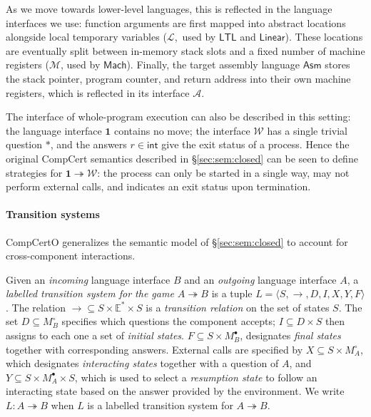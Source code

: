 \documentclass[acmsmall,authordraft]{acmart}
\newcommand{\kw}[1]{\ensuremath{ \mathsf{#1} }}
\newcommand{\que}{\circ}
\newcommand{\ans}{\bullet}
\begin{document}
As we move towards lower-level languages,
this is reflected in the language interfaces we use:
function arguments are first mapped into
abstract locations alongside local temporary variables
($\mathcal{L}$,~used by \kw{LTL} and \kw{Linear}).
These locations are eventually split between
in-memory stack slots and a fixed number of machine registers
($\mathcal{M}$, used by \kw{Mach}).
Finally, the target assembly language \kw{Asm}
stores the stack pointer, program counter,
and return address into their own machine registers,
which is reflected in its interface $\mathcal{A}$.

The interface of whole-program execution
can also be described in this setting:
the language interface $\mathbf{1}$ contains no move;
the interface $\mathcal{W}$ has a single trivial question $*$,
and the answers $r \in \kw{int}$
give the exit status of a process.
Hence the original CompCert semantics described in
\S\ref{sec:sem:closed}
can be seen to define strategies for
$\mathbf{1} \twoheadrightarrow \mathcal{W}$:
the process can only be started in a single way,
may not perform external calls,
and indicates an exit status upon termination.


\paragraph{Transition systems} %

CompCertO generalizes
the semantic model of
\S\ref{sec:sem:closed}
to account for cross-component interactions.

\begin{definition} \label{def:lts}
Given an \emph{incoming} language interface $B$
and an \emph{outgoing} language interface $A$,
a \emph{labelled transition system for the game $A \twoheadrightarrow B$}
is a tuple $L = \langle S, \rightarrow, D, I, X, Y, F \rangle$.
The relation
${\rightarrow} \subseteq S \times \mathbb{E}^* \times S$ is
a \emph{transition relation} on the set of states $S$.
The set $D \subseteq M_B^\que$ specifies which
questions the component accepts;
$I \subseteq D \times S$ then
assigns to each one a set of \emph{initial states}.
$F \subseteq S \times M_B^\ans$,
designates \emph{final states} together with corresponding answers.
External calls are specified by
$X \subseteq S \times M_A^\que$,
which designates \emph{interacting states} together with
a question of $A$, and
$Y \subseteq S \times M_A^\ans \times S$,
which is used to select a \emph{resumption state}
to follow an interacting state
based on the answer provided by the environment.
We write $L : A \twoheadrightarrow B$ when
$L$ is a labelled transition system for $A \twoheadrightarrow B$.
\end{definition}
\end{document}
